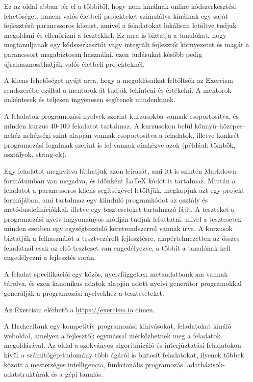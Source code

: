 Ez az oldal abban tér el a többitől, hogy nem kínálnak online kódszerkesztési lehetőséget, hanem valós életbeli projekteket szimulálva kínálnak egy saját fejlesztésű parancssoros klienst, amivel a feladatokat lokálisan letöltve tudjuk megoldani és ellenőrizni a tesztekkel. Ez arra is biztatja a tanulókat, hogy megtanuljanak egy kódszerkesztőt vagy integrált fejlesztői környezetet és magát a parancssort magabiztosan használni, ezen tudásukat később pedig újrahasznosíthatják valós életbeli projekteknél.

A kliens lehetőséget nyújt arra, hogy a megoldásaikat feltöltsék az Exercism rendszerébe ezáltal a mentorok át tudják tekinteni és értékelni. A mentorok önkéntesek és teljesen ingyenesen segítenek mindenkinek.

A feladatok programozási nyelvek szerint kurzusokba vannak csoportosítva, és minden kurzus 40-100 feladatot tartalmaz. A kurzusokon belül könnyű--közepes--nehéz nehézségi szint alapján vannak csoportosítva a feladatok, illetve konkrét programozási fogalmak szerint is fel vannak címkézve azok (például: tömbök, osztályok, string-ek).

Egy feladatot megnyitva láthatjuk azon leírását, ami itt is szintén Markdown formátumban van megadva, és időnként \LaTeX{} kódot is tartalmaz. Miután a feladatot a parancssoros kliens segítségével letöltjük, megkapjuk azt egy projekt formájában, ami tartalmaz egy kiinduló programkódot az osztály és metódusdefiníciókkal, illetve egy teszteseteket tartalmazó fájlt. A teszteket a programozási nyelv hagyományos módján tudjuk lefuttatni, mivel a tesztesetek minden esetben egy egységtesztelő keretrendszerrel vannak írva. A kurzusok biztatják a felhasználót a tesztvezérelt fejlesztésre, alapértelmezetten az összes feladatnál csak az első teszteset van engedélyezve, a többit a tanulónak kell engedélyezni a fejlesztés során.

A feladat specifikációi egy közös, nyelvfüggetlen metaadatbankban vannak tárolva, és ezen kanonikus adatok alapján adott nyelvi generátor programokkal generálják a programozási nyelvekhez a teszteseteket. \cite{exercism_problem-specifications} \cite{exercism_csharp-generator}

Az Exercism elérhető a \url{https://exercism.io} címen.


A HackerRank egy kompetitív programozási kihívásokat, feladatokat kínáló weboldal, amelyen a fejlesztők egymással mérkőzhetnek meg a feladatok megoldásával. Az oldal a szokványos algoritmizáló és interjúztatási feladatokon kívül a számítógép-tudomány több ágáról is biztosít feladatokat, ilyenek többek között a mesterséges intelligencia, funkcionális programozás, adatbázisok-adatstruktúrák és a gépi tanulás. \cite{hackerrank} \cite{hackerrank_faq}

